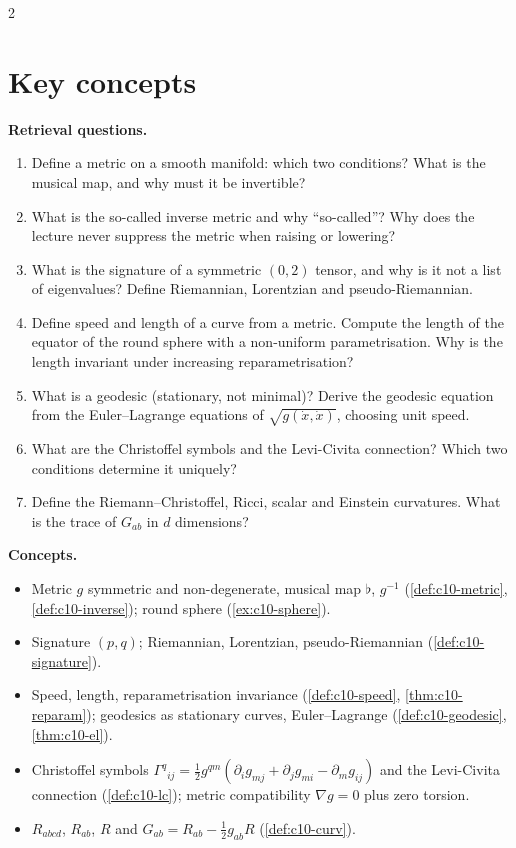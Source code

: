 \begin{paracol}{2}
\section*{Key concepts}
\begin{keyconcepts}
\textbf{Retrieval questions.}
\begin{enumerate}
  \item Define a metric on a smooth manifold: which two conditions? What is the musical map, and why must it be invertible?
  \item What is the so-called inverse metric and why ``so-called''? Why does the lecture never suppress the metric when raising or lowering?
  \item What is the signature of a symmetric $(0,2)$ tensor, and why is it not a list of eigenvalues? Define Riemannian, Lorentzian and pseudo-Riemannian.
  \item Define speed and length of a curve from a metric. Compute the length of the equator of the round sphere with a non-uniform parametrisation. Why is the length invariant under increasing reparametrisation?
  \item What is a geodesic (stationary, not minimal)? Derive the geodesic equation from the Euler--Lagrange equations of $\sqrt{g(\dot x,\dot x)}$, choosing unit speed.
  \item What are the Christoffel symbols and the Levi-Civita connection? Which two conditions determine it uniquely?
  \item Define the Riemann--Christoffel, Ricci, scalar and Einstein curvatures. What is the trace of $G_{ab}$ in $d$ dimensions?
\end{enumerate}
\textbf{Concepts.}
\begin{itemize}
  \item Metric $g$ symmetric and non-degenerate, musical map $\flat$, $g^{-1}$ (\cref{def:c10-metric}, \cref{def:c10-inverse}); round sphere (\cref{ex:c10-sphere}).
  \item Signature $(p,q)$; Riemannian, Lorentzian, pseudo-Riemannian (\cref{def:c10-signature}).
  \item Speed, length, reparametrisation invariance (\cref{def:c10-speed}, \cref{thm:c10-reparam}); geodesics as stationary curves, Euler--Lagrange (\cref{def:c10-geodesic}, \cref{thm:c10-el}).
  \item Christoffel symbols $\Gamma^q{}_{ij}=\tfrac12g^{qm}(\partial_ig_{mj}+\partial_jg_{mi}-\partial_mg_{ij})$ and the Levi-Civita connection (\cref{def:c10-lc}); metric compatibility $\nabla g=0$ plus zero torsion.
  \item $R_{abcd}$, $R_{ab}$, $R$ and $G_{ab}=R_{ab}-\tfrac12g_{ab}R$ (\cref{def:c10-curv}).
\end{itemize}
\end{keyconcepts}

\flushside
\end{paracol}
